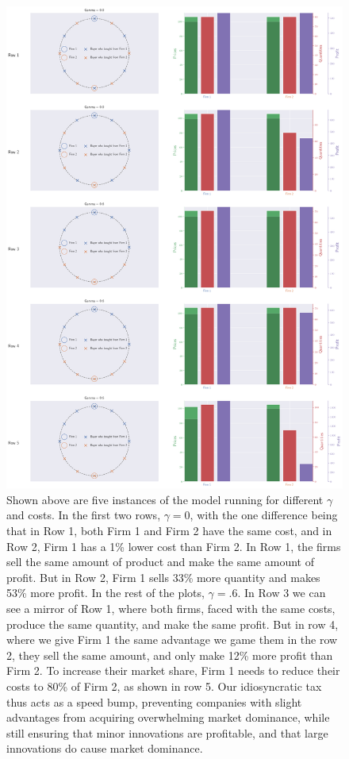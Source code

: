 \documentclass[11pt]{article}
\begin{document}
\begin{figure}[[p!htb] %
	\centering
	\vspace{-2cm} %
  \includegraphics[width=\linewidth]{5x2plot.png}
  \caption{\small{Shown above are five instances of the model running for different
  $\gamma$ and costs. In the first two rows, $\gamma=0$, with the one
  difference being that in Row 1, both Firm 1 and Firm 2 have the same cost,
  and in Row 2, Firm 1 has a 1\% lower cost than Firm 2. In Row 1, the firms
  sell the same amount of product and make the same amount of profit. But in
  Row 2, Firm 1 sells 33\% more quantity and makes 53\% more profit.
  In the rest of the plots, $\gamma = .6$. In Row 3 we can see a mirror of Row
  1, where both firms, faced with the same costs, produce the same quantity,
  and make the same profit. But in row 4, where we give Firm 1
  the same advantage we game them in the row 2, they sell the same amount, and
  only make 12\% more profit than Firm 2. To increase their market share,
  Firm 1 needs to reduce their costs to 80\% of Firm 2, as shown in row 5.
  Our idiosyncratic tax thus acts as a speed bump, preventing companies with
  slight advantages from acquiring overwhelming market dominance, while still
  ensuring that minor innovations are profitable, and that large innovations do
  cause market dominance.}}
  \label{fig:fig3x2SingleTimestep}
\end{figure}
\end{document}

